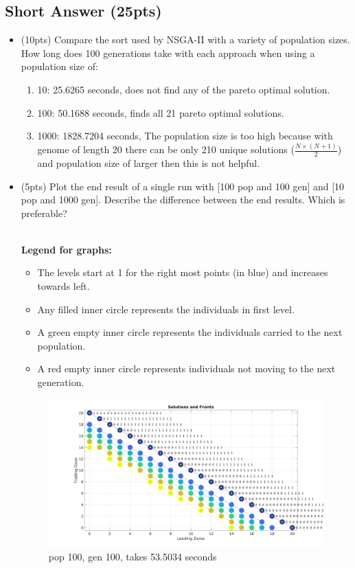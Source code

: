 \documentclass{article}
\begin{document}
\newpage
\subsection{Short Answer (25pts)}
\begin{itemize}
	\item (10pts) Compare the sort used by NSGA-II with a variety of population sizes. How long does 100 generations take with each approach when using a population size of:
	\begin{enumerate}
		\item 10: {\color{blue}25.6265 seconds, does not find any of the pareto optimal solution.}
		\item 100: {\color{blue}50.1688 seconds, finds all 21 pareto optimal solutions.}
		\item 1000: {\color{blue} 1828.7204 seconds, The population size is too high because with genome of length 20 there can be only 210 unique solutions ($\frac{N \times (N+1)}{2}$) and population size of larger then this is not helpful.}
	\end{enumerate}
	
	
	\item (5pts) Plot the end result of a single run with [100 pop and 100 gen] and [10 pop and 1000 gen]. Describe the difference between the end results. Which is preferable? \\ \\
	{\color{blue} \textbf{Legend for graphs:} 
		\begin{itemize}
			\item The levels start at 1 for the right most points (in blue) and increases towards left.
			\item Any filled inner circle represents the individuals in first level.
			\item A green empty inner circle represents the  individuals carried to the next population.
			\item A red empty inner circle represents individuals not moving to the next generation.
		\end{itemize}
	}
	\begin{figure}[h]
		\centering
		\includegraphics[width=0.7\linewidth]{img/p_100_g_100}
		\caption{pop 100, gen 100, takes 53.5034 seconds}
		\label{fig:p_100_g_100}
	\end{figure}
	

\end{itemize}
\end{document}
